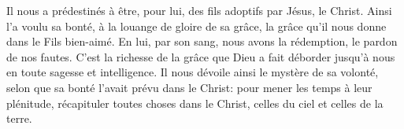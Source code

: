 Il nous a prédestinés à être, pour lui, des fils adoptifs par Jésus, le Christ.
Ainsi l’a voulu sa bonté, à la louange de gloire de sa grâce,
	la grâce qu’il nous donne dans le Fils bien-aimé.
En lui, par son sang, nous avons la rédemption, le pardon de nos fautes.
C’est la richesse de la grâce que Dieu a fait déborder jusqu’à nous
	en toute sagesse et intelligence.
Il nous dévoile ainsi le mystère de sa volonté,
	selon que sa bonté l’avait prévu dans le Christ:
	pour mener les temps à leur plénitude,
	récapituler toutes choses dans le Christ, celles du ciel et celles de la terre.
